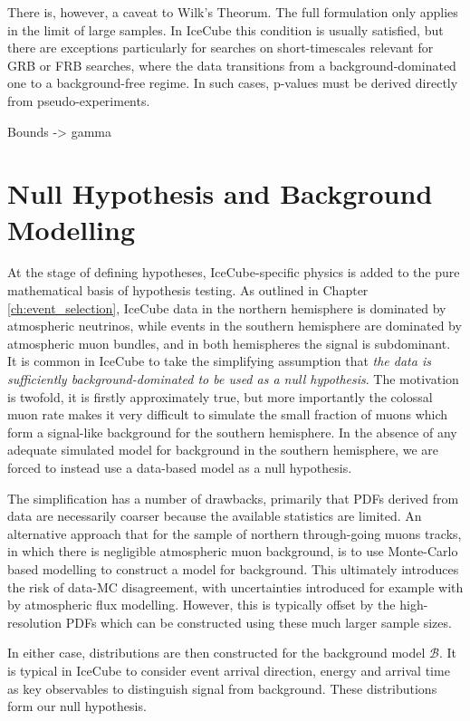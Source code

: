 There is, however, a caveat to Wilk's Theorum. The full formulation only applies in the limit of large samples. In IceCube this condition is usually satisfied, but there are exceptions particularly for searches on short-timescales relevant for GRB or FRB searches, where the data transitions from a background-dominated one to a background-free regime. In such cases, p-values must be derived directly from pseudo-experiments. 

Bounds -> gamma

\section{Null Hypothesis and Background Modelling}

At the stage of defining hypotheses, IceCube-specific physics is added to the pure mathematical basis of hypothesis testing. As outlined in Chapter \ref{ch:event_selection}, IceCube data in the northern hemisphere is dominated by atmospheric neutrinos, while events in the southern hemisphere are dominated by atmospheric muon bundles, and in both hemispheres the signal is subdominant. It is common in IceCube to take the simplifying assumption that \emph{the data is sufficiently background-dominated to be used as a null hypothesis}. The motivation is twofold, it is firstly approximately true, but more importantly the colossal muon rate makes it very difficult to simulate the small fraction of muons which form a signal-like background for the southern hemisphere. In the absence of any adequate simulated model for background in the southern hemisphere, we are forced to instead use a data-based model as a null hypothesis.

The simplification has a number of drawbacks, primarily that PDFs derived from data are necessarily coarser because the available statistics are limited. An alternative approach that for the sample of northern through-going muons tracks, in which there is negligible atmospheric muon background, is to use Monte-Carlo based modelling to construct a model for background. This ultimately introduces the risk of data-MC disagreement,  with uncertainties introduced for example with by atmospheric flux modelling. However, this is typically offset by the high-resolution PDFs which can be constructed using these much larger sample sizes.

In either case, distributions are then constructed for the background model $\mathcal{B}$. It is typical in IceCube to consider event arrival direction, energy and arrival time as key observables to distinguish signal from background. These distributions form our null hypothesis. 

